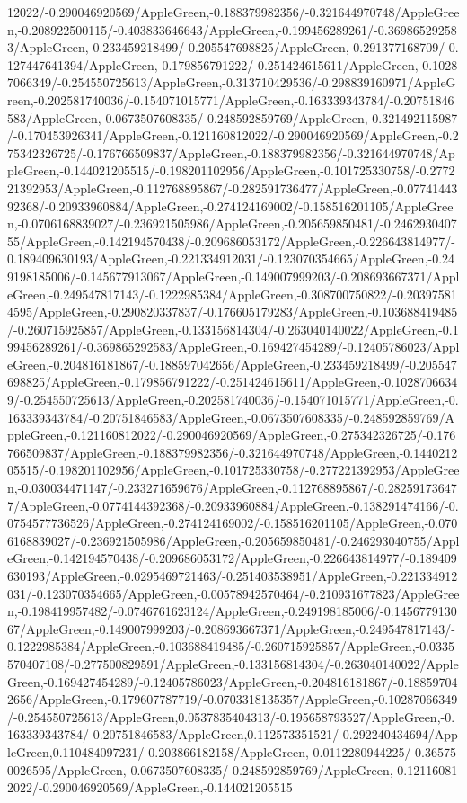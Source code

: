 {\begin{tikzternal}
{12022/-0.290046920569/AppleGreen,-0.188379982356/-0.321644970748/AppleGreen,-0.208922500115/-0.403833646643/AppleGreen,-0.199456289261/-0.369865292583/AppleGreen,-0.233459218499/-0.205547698825/AppleGreen,-0.291377168709/-0.127447641394/AppleGreen,-0.179856791222/-0.251424615611/AppleGreen,-0.10287066349/-0.254550725613/AppleGreen,-0.313710429536/-0.298839160971/AppleGreen,-0.202581740036/-0.154071015771/AppleGreen,-0.163339343784/-0.20751846583/AppleGreen,-0.0673507608335/-0.248592859769/AppleGreen,-0.321492115987/-0.170453926341/AppleGreen,-0.121160812022/-0.290046920569/AppleGreen,-0.275342326725/-0.176766509837/AppleGreen,-0.188379982356/-0.321644970748/AppleGreen,-0.144021205515/-0.198201102956/AppleGreen,-0.101725330758/-0.277221392953/AppleGreen,-0.112768895867/-0.282591736477/AppleGreen,-0.0774144392368/-0.20933960884/AppleGreen,-0.274124169002/-0.158516201105/AppleGreen,-0.0706168839027/-0.236921505986/AppleGreen,-0.205659850481/-0.246293040755/AppleGreen,-0.142194570438/-0.209686053172/AppleGreen,-0.226643814977/-0.189409630193/AppleGreen,-0.221334912031/-0.123070354665/AppleGreen,-0.249198185006/-0.145677913067/AppleGreen,-0.149007999203/-0.208693667371/AppleGreen,-0.249547817143/-0.1222985384/AppleGreen,-0.308700750822/-0.203975814595/AppleGreen,-0.290820337837/-0.176605179283/AppleGreen,-0.103688419485/-0.260715925857/AppleGreen,-0.133156814304/-0.263040140022/AppleGreen,-0.199456289261/-0.369865292583/AppleGreen,-0.169427454289/-0.12405786023/AppleGreen,-0.204816181867/-0.188597042656/AppleGreen,-0.233459218499/-0.205547698825/AppleGreen,-0.179856791222/-0.251424615611/AppleGreen,-0.10287066349/-0.254550725613/AppleGreen,-0.202581740036/-0.154071015771/AppleGreen,-0.163339343784/-0.20751846583/AppleGreen,-0.0673507608335/-0.248592859769/AppleGreen,-0.121160812022/-0.290046920569/AppleGreen,-0.275342326725/-0.176766509837/AppleGreen,-0.188379982356/-0.321644970748/AppleGreen,-0.144021205515/-0.198201102956/AppleGreen,-0.101725330758/-0.277221392953/AppleGreen,-0.030034471147/-0.233271659676/AppleGreen,-0.112768895867/-0.282591736477/AppleGreen,-0.0774144392368/-0.20933960884/AppleGreen,-0.138291474166/-0.0754577736526/AppleGreen,-0.274124169002/-0.158516201105/AppleGreen,-0.0706168839027/-0.236921505986/AppleGreen,-0.205659850481/-0.246293040755/AppleGreen,-0.142194570438/-0.209686053172/AppleGreen,-0.226643814977/-0.189409630193/AppleGreen,-0.0295469721463/-0.251403538951/AppleGreen,-0.221334912031/-0.123070354665/AppleGreen,-0.00578942570464/-0.210931677823/AppleGreen,-0.198419957482/-0.0746761623124/AppleGreen,-0.249198185006/-0.145677913067/AppleGreen,-0.149007999203/-0.208693667371/AppleGreen,-0.249547817143/-0.1222985384/AppleGreen,-0.103688419485/-0.260715925857/AppleGreen,-0.0335570407108/-0.277500829591/AppleGreen,-0.133156814304/-0.263040140022/AppleGreen,-0.169427454289/-0.12405786023/AppleGreen,-0.204816181867/-0.188597042656/AppleGreen,-0.179607787719/-0.0703318135357/AppleGreen,-0.10287066349/-0.254550725613/AppleGreen,0.0537835404313/-0.195658793527/AppleGreen,-0.163339343784/-0.20751846583/AppleGreen,0.112573351521/-0.292240434694/AppleGreen,0.110484097231/-0.203866182158/AppleGreen,-0.0112280944225/-0.365750026595/AppleGreen,-0.0673507608335/-0.248592859769/AppleGreen,-0.121160812022/-0.290046920569/AppleGreen,-0.144021205515}
\end{tikzternal}}
